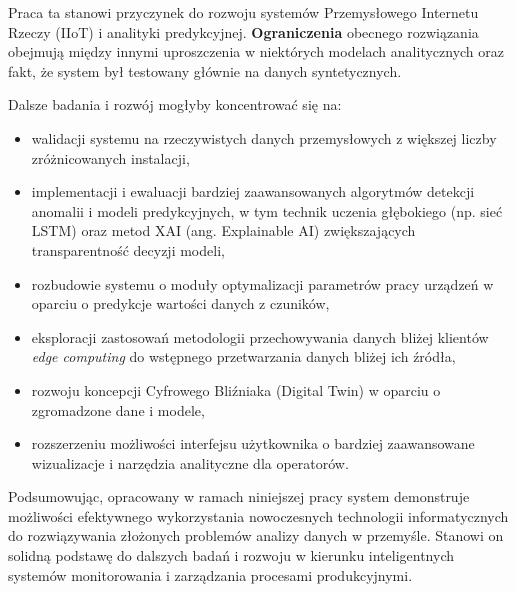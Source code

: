 Praca ta stanowi przyczynek do rozwoju systemów Przemysłowego Internetu Rzeczy (IIoT) i analityki predykcyjnej. \textbf{Ograniczenia} obecnego rozwiązania obejmują między innymi uproszczenia w niektórych modelach analitycznych oraz fakt, że system był testowany głównie na danych syntetycznych. 

\vspace{0.3em}

Dalsze badania i rozwój mogłyby koncentrować się na:
\begin{itemize}
    \item walidacji systemu na rzeczywistych danych przemysłowych z większej liczby zróżnicowanych instalacji,
    \item implementacji i ewaluacji bardziej zaawansowanych algorytmów detekcji anomalii i modeli predykcyjnych, w tym technik uczenia głębokiego (np. sieć LSTM) oraz metod XAI (ang. Explainable AI) zwiększających transparentność decyzji modeli,
    \item rozbudowie systemu o moduły optymalizacji parametrów pracy urządzeń w oparciu o predykcje wartości danych z czuników,
    \item eksploracji zastosowań metodologii przechowywania danych bliżej klientów \textit{edge computing} do wstępnego przetwarzania danych bliżej ich źródła,
    \item rozwoju koncepcji Cyfrowego Bliźniaka (Digital Twin) w oparciu o zgromadzone dane i modele,
    \item rozszerzeniu możliwości interfejsu użytkownika o bardziej zaawansowane wizualizacje i narzędzia analityczne dla operatorów.
\end{itemize}

Podsumowując, opracowany w ramach niniejszej pracy system demonstruje możliwości efektywnego wykorzystania nowoczesnych technologii informatycznych do rozwiązywania złożonych problemów analizy danych w przemyśle. Stanowi on solidną podstawę do dalszych badań i rozwoju w kierunku inteligentnych systemów monitorowania i zarządzania procesami produkcyjnymi. 